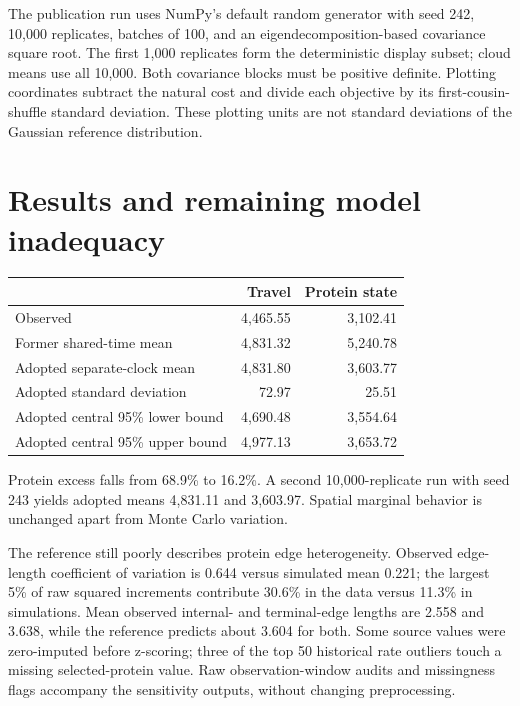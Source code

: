 \documentclass[10pt,letterpaper]{article}
\begin{document}
The publication run uses NumPy's default random generator with seed 242,
10,000 replicates, batches of 100, and an eigendecomposition-based covariance
square root. The first 1,000 replicates form the deterministic display subset;
cloud means use all 10,000. Both covariance blocks must be positive definite.
Plotting coordinates subtract the natural cost and divide each objective by
its first-cousin-shuffle standard deviation. These plotting units are not
standard deviations of the Gaussian reference distribution.

\section{Results and remaining model inadequacy}

\begin{center}
\begin{tabular}{lrr}
\toprule
 & Travel & Protein state\\
\midrule
Observed & 4,465.55 & 3,102.41\\
Former shared-time mean & 4,831.32 & 5,240.78\\
Adopted separate-clock mean & 4,831.80 & 3,603.77\\
Adopted standard deviation & 72.97 & 25.51\\
Adopted central 95\% lower bound & 4,690.48 & 3,554.64\\
Adopted central 95\% upper bound & 4,977.13 & 3,653.72\\
\bottomrule
\end{tabular}
\end{center}

Protein excess falls from 68.9\% to 16.2\%. A second 10,000-replicate run
with seed 243 yields adopted means 4,831.11 and 3,603.97. Spatial marginal
behavior is unchanged apart from Monte Carlo variation.

The reference still poorly describes protein edge heterogeneity. Observed
edge-length coefficient of variation is 0.644 versus simulated mean 0.221;
the largest 5\% of raw squared increments contribute 30.6\% in the data
versus 11.3\% in simulations. Mean observed internal- and terminal-edge
lengths are 2.558 and 3.638, while the reference predicts about 3.604 for
both. Some source values were zero-imputed before z-scoring; three of the
top 50 historical rate outliers touch a missing selected-protein value.
Raw observation-window audits and missingness flags accompany the sensitivity
outputs, without changing preprocessing.
\end{document}
